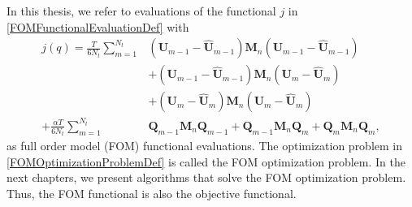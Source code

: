 In this thesis, we refer to evaluations of the functional $j$ in \eqref{FOMFunctionalEvaluationDef} with
\begin{equation*}
\begin{aligned}
j(q)=\frac{T}{6N_t}\sum_{m=1}^{N_t}&\left(\mathbf{U}_{m-1}-\hat{\mathbf{U}}_{m-1}\right)\mathbf{M}_n\left(\mathbf{U}_{m-1}-\hat{\mathbf{U}}_{m-1}\right)\\
&+ \left(\mathbf{U}_{m-1}-\hat{\mathbf{U}}_{m-1}\right)\mathbf{M}_n\left(\mathbf{U}_{m}-\hat{\mathbf{U}}_{m}\right)\\
&+ \left(\mathbf{U}_{m}-\hat{\mathbf{U}}_{m}\right)\mathbf{M}_n\left(\mathbf{U}_{m}-\hat{\mathbf{U}}_{m}\right)\\
+ \frac{\alpha T}{6N_t}\sum_{m=1}^{N_t}&\mathbf{Q}_{m-1}\mathbf{M}_n\mathbf{Q}_{m-1} + \mathbf{Q}_{m-1}\mathbf{M}_n\mathbf{Q}_{m} + \mathbf{Q}_{m}\mathbf{M}_n\mathbf{Q}_{m},
\end{aligned}
\end{equation*}
as full order model (FOM) functional evaluations. The optimization problem in \eqref{FOMOptimizationProblemDef} is called the FOM optimization problem. In the next chapters, we present algorithms that solve the FOM optimization problem. Thus, the FOM functional is also the objective functional.
































































